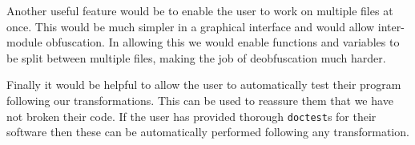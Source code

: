 \documentclass[twoside,a4paper]{report}
\begin{document}
Another useful feature would be to enable the user to work on multiple files at once. This would be much simpler in a graphical interface and would allow
inter-module obfuscation. In allowing this we would enable functions and variables to be split between multiple files, making the job of deobfuscation much
harder. 

Finally it would be helpful to allow the user to automatically test their program following our transformations. This can be used to reassure them that we
have not broken their code. If the user has provided thorough \texttt{doctest}s for their software then these can be automatically performed following any
transformation.



\end{document}
